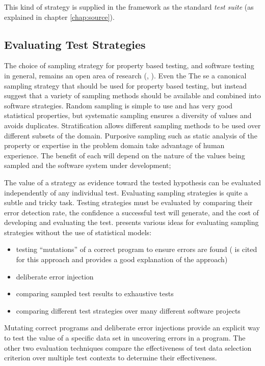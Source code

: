 \noindent
This kind of strategy is supplied in the \GC framework as the standard \emph{test suite}
(as explained in chapter \ref{chap:source}).

\subsection{Evaluating Test Strategies}

The choice of sampling strategy for property based testing,
and software testing in general,
remains an open area of research
(\cite{ZhuHallMay1997}, \cite{Hieronsetal2009}).
Even the 
The se a canonical sampling strategy
that should be used for property based testing,
but instead suggest that a variety of sampling methods 
should be available and combined into software strategies.
Random sampling is simple to use and has very good statistical properties,
but systematic sampling ensures a diversity of values and avoids duplicates.
Stratification allows different sampling methods to be used 
over different subsets of the domain.
Purposive sampling such as static analysis of the property
or expertise in the problem domain take advantage of human experience.
The benefit of each will depend on 
the nature of the values being sampled and 
the software system under development;

The value of a strategy as evidence toward the tested hypothesis
can be evaluated independently of any individual test.
Evaluating sampling strategies is quite a subtle and tricky task.
Testing strategies must be evaluated by comparing their error detection rate,
the confidence a successful test will generate,
and the cost of developing and evaluating the test.
\cite{WeyukerEtal1991} presents various ideas for evaluating sampling strategies
without the use of statistical models:

\begin{itemize}
\item testing ``mutations'' of a correct program to ensure errors are found
(\cite{BuddEtal1980} is cited for this approach and provides a good explanation of the approach)
\item deliberate error injection
\item comparing sampled test results to exhaustive tests
\item comparing different test strategies over many different software projects
\end{itemize}

\noindent
Mutating correct programs and deliberate error injections
provide an explicit way to test the value of a specific data set
in uncovering errors in a program.
The other two evaluation techniques compare the effectiveness
of test data selection criterion over multiple test contexts to determine
their effectiveness.

